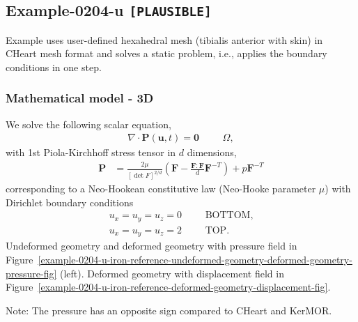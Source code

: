 %
\clearpage
%
\subsection{Example-0204-u \texttt{[PLAUSIBLE]}}
%
Example uses user-defined hexahedral mesh (tibialis anterior with skin)
in CHeart mesh format and solves a static problem,
i.e., applies the boundary conditions in one step.\\[3ex]

%
\subsubsection{Mathematical model - 3D}
%
We solve the following scalar equation,
%
\begin{align}
    \nabla \cdot \boldsymbol{P} (\boldsymbol{u}, t) = \boldsymbol{0} & &&\Omega,
\end{align}
%
with 1st Piola-Kirchhoff stress tensor in $d$ dimensions,
%
\begin{align}
    \boldsymbol{P} &= \frac{2 \mu}{[\det F]^{2/d}} \left( \boldsymbol{F} - \frac{\boldsymbol{F} : \boldsymbol{F}}{d} \boldsymbol{F}^{-T} \right) + p \boldsymbol{F}^{-T}
\end{align}
%
corresponding to a Neo-Hookean constitutive law (Neo-Hooke parameter $\mu$)
with Dirichlet boundary conditions
%
\begin{align}
    u_x = u_y = u_z = 0 & && \text{BOTTOM}, \\
		u_x = u_y = u_z = 2 & && \text{TOP}.
\end{align}
%
Undeformed geometry and deformed geometry with pressure field
in Figure~\ref{example-0204-u-iron-reference-undeformed-geometry-deformed-geometry-pressure-fig} (left).
Deformed geometry with displacement field
in Figure~\ref{example-0204-u-iron-reference-deformed-geometry-displacement-fig}.

Note: The pressure has an opposite sign compared to CHeart and KerMOR.
%
%

